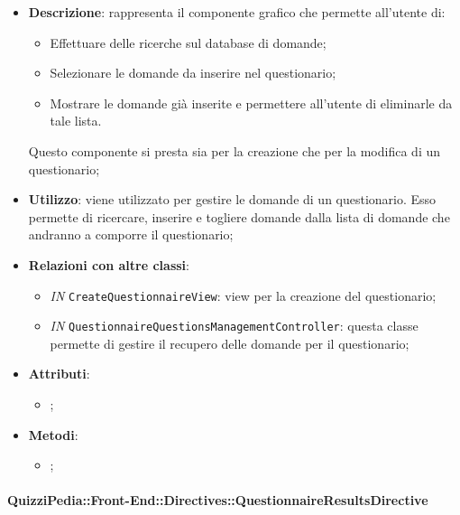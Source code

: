 \begin{itemize}
	\item \textbf{Descrizione}: rappresenta il componente grafico che permette all'utente di:
		\begin{itemize}
			\item Effettuare delle ricerche sul database di domande;
			\item Selezionare le domande da inserire nel questionario;
			\item Mostrare le domande già inserite e permettere all'utente di eliminarle da tale lista.
		\end{itemize}
		Questo componente si presta sia per la creazione che per la modifica di un questionario;
	\item \textbf{Utilizzo}: viene utilizzato per gestire le domande di un questionario. Esso permette di ricercare, inserire e togliere domande dalla lista di domande che andranno a comporre il questionario;
	\item \textbf{Relazioni con altre classi}: 
	\begin{itemize}
		\item \textit{IN} \texttt{CreateQuestionnaireView}: view per la creazione del questionario;
		\item \textit{IN} \texttt{QuestionnaireQuestionsManagementController}: questa classe permette di gestire il recupero delle domande per il questionario;
	\end{itemize}
	\item \textbf{Attributi}: 
	\begin{itemize}
		\item ;
	\end{itemize}
	\item \textbf{Metodi}: 
	\begin{itemize}
		\item ;
	\end{itemize}
\end{itemize}

\paragraph{QuizziPedia::Front-End::Directives::QuestionnaireResultsDirective}

\label{QuizziPedia::Front-End::Directives::QuestionnaireResultsDirective}

